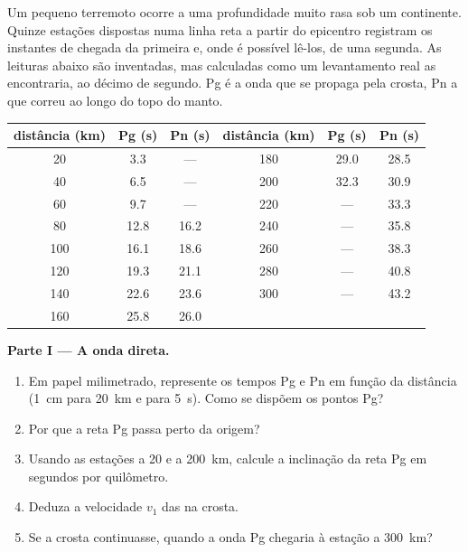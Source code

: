 \begin{problem}
\label{pb:g11:seismic-structure:1}
Um pequeno terremoto ocorre a uma profundidade muito rasa sob um continente.
Quinze estações dispostas numa linha reta a partir do epicentro registram os
instantes de chegada da primeira  e, onde é possível lê-los, de uma
segunda. As leituras abaixo são inventadas, mas calculadas como um
levantamento real as encontraria, ao décimo de segundo. Pg é a onda que se
propaga pela crosta, Pn a que correu ao longo do topo do manto.

\begin{center}
\small
\begin{tabular}{|c|c|c||c|c|c|}
\hline
distância (\unit{km}) & Pg (\unit{s}) & Pn (\unit{s}) & distância (\unit{km}) & Pg (\unit{s}) & Pn (\unit{s}) \\ \hline
20 & 3.3 & --- & 180 & 29.0 & 28.5 \\ \hline
40 & 6.5 & --- & 200 & 32.3 & 30.9 \\ \hline
60 & 9.7 & --- & 220 & --- & 33.3 \\ \hline
80 & 12.8 & 16.2 & 240 & --- & 35.8 \\ \hline
100 & 16.1 & 18.6 & 260 & --- & 38.3 \\ \hline
120 & 19.3 & 21.1 & 280 & --- & 40.8 \\ \hline
140 & 22.6 & 23.6 & 300 & --- & 43.2 \\ \hline
160 & 25.8 & 26.0 & & & \\ \hline
\end{tabular}
\end{center}

\medskip
\noindent\textbf{Parte I --- A onda direta.}
\begin{enumerate}
  \item Em papel milimetrado, represente os tempos Pg e Pn em função da
        distância (\qty{1}{cm} para \qty{20}{km} e para \qty{5}{s}). Como se
        dispõem os pontos Pg?
  \item Por que a reta Pg passa perto da origem?
  \item Usando as estações a 20 e a \qty{200}{km}, calcule a inclinação da
        reta Pg em segundos por quilômetro.
  \item Deduza a velocidade $v_1$ das  na crosta.
  \item Se a crosta continuasse, quando a onda Pg chegaria à estação a
        \qty{300}{km}?
\end{enumerate}


\end{problem}
